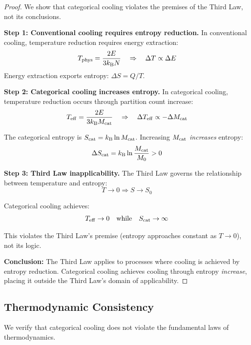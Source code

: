 \begin{proof}
We show that categorical cooling violates the premises of the Third Law, not its conclusions.

\textbf{Step 1: Conventional cooling requires entropy reduction.}
In conventional cooling, temperature reduction requires energy extraction:
\begin{equation}
T_{\mathrm{phys}} = \frac{2E}{3k_{\mathrm{B}} N} \quad \Rightarrow \quad \Delta T \propto \Delta E
\end{equation}
Energy extraction exports entropy: $\Delta S = Q/T$.

\textbf{Step 2: Categorical cooling increases entropy.}
In categorical cooling, temperature reduction occurs through partition count increase:
\begin{equation}
T_{\mathrm{eff}} = \frac{2E}{3k_{\mathrm{B}} M_{\mathrm{cat}}} \quad \Rightarrow \quad \Delta T_{\mathrm{eff}} \propto -\Delta M_{\mathrm{cat}}
\end{equation}

The categorical entropy is $S_{\mathrm{cat}} = k_{\mathrm{B}} \ln M_{\mathrm{cat}}$. Increasing $M_{\mathrm{cat}}$ \textit{increases} entropy:
\begin{equation}
\Delta S_{\mathrm{cat}} = k_{\mathrm{B}} \ln \frac{M_{\mathrm{cat}}}{M_0} > 0
\end{equation}

\textbf{Step 3: Third Law inapplicability.}
The Third Law governs the relationship between temperature and entropy:
\begin{equation}
T \to 0 \Rightarrow S \to S_0
\end{equation}

Categorical cooling achieves:
\begin{equation}
T_{\mathrm{eff}} \to 0 \quad \text{while} \quad S_{\mathrm{cat}} \to \infty
\end{equation}

This violates the Third Law's premise (entropy approaches constant as $T \to 0$), not its logic.

\textbf{Conclusion:} The Third Law applies to processes where cooling is achieved by entropy reduction. Categorical cooling achieves cooling through entropy \textit{increase}, placing it outside the Third Law's domain of applicability.
\end{proof}

\subsection{Thermodynamic Consistency}

We verify that categorical cooling does not violate the fundamental laws of thermodynamics.

